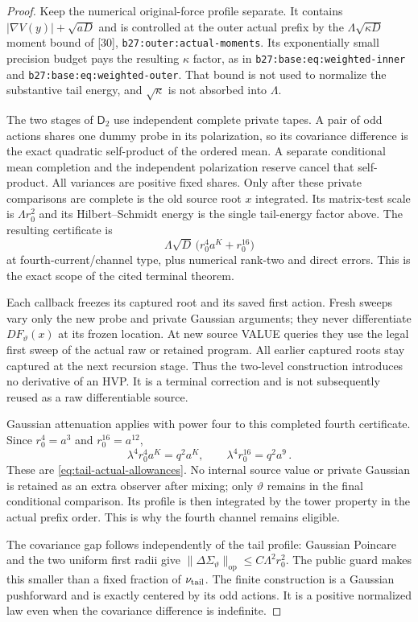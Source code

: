 \documentclass[11pt]{article}
\numberwithin{equation}{section}
\theoremstyle{remark}\newtheorem{remark}[theorem]{Remark}
\newcommand{\op}{\mathrm{op}}\newcommand{\LL}{\Lambda}
\newcommand{\norm}[1]{\lVert#1\rVert}
\newcommand{\src}[1]{\texttt{\nolinkurl{#1}}}
\begin{document}
\begin{proof}
Keep the numerical original-force profile separate. It contains
$|\nabla V(y)|+\sqrt{aD}$ and is controlled at the outer actual
prefix by the $\LL\sqrt{\kappa D}$ moment bound of [30],
\src{b27:outer:actual-moments}. Its exponentially small precision
budget pays the resulting $\kappa$ factor, as in
\src{b27:base:eq:weighted-inner} and
\src{b27:base:eq:weighted-outer}. That bound is not used to
normalize the substantive tail energy, and $\sqrt\kappa$ is
not absorbed into $\LL$.

The two stages of $\mathsf D_2$ use independent complete private
tapes. A pair of odd actions shares one dummy probe in its
polarization, so its covariance difference is the exact quadratic
self-product of the ordered mean. A separate conditional mean
completion and the independent polarization reserve cancel that
self-product. All variances are positive fixed shares. Only after
these private comparisons are complete is the old source root $x$
integrated. Its matrix-test scale is $\LL r_0^2$ and its
Hilbert--Schmidt energy is the single tail-energy factor above.
The resulting certificate is
\[
 \LL\sqrt D\,\bigl(r_0^4a^K+r_0^{16}\bigr)
\]
at fourth-current/channel type, plus numerical rank-two and direct
errors. This is the exact scope of the cited terminal theorem.

Each callback freezes its captured root and its saved first action.
Fresh sweeps vary only the new probe and private Gaussian arguments;
they never differentiate $DF_\vartheta(x)$ at its frozen location.
At new source VALUE queries they use the legal first sweep of the
actual raw or retained program. All earlier captured roots stay
captured at the next recursion stage. Thus the two-level construction
introduces no derivative of an HVP. It is a terminal correction and
is not subsequently reused as a raw differentiable source.

Gaussian attenuation applies with power four to this completed
fourth certificate. Since $r_0^4=a^3$ and $r_0^{16}=a^{12}$,
\[
 \lambda^4r_0^4a^K=q^2a^K,\qquad
 \lambda^4r_0^{16}=q^2a^9\,.
\]
These are \eqref{eq:tail-actual-allowances}. No internal source
value or private Gaussian is retained as an extra observer after
mixing; only $\vartheta$ remains in the final conditional comparison.
Its profile is then integrated by the tower property in the actual
prefix order. This is why the fourth channel remains eligible.

The covariance gap follows independently of the tail profile:
Gaussian Poincare and the two uniform first radii give
$\norm{\Delta\Sigma_\vartheta}_{\op}\le C\LL^2r_0^2$.
The public guard makes this smaller than a fixed fraction of
$\nu_{\rm tail}$. The finite construction is a Gaussian pushforward
and is exactly centered by its odd actions. It is a positive
normalized law even when the covariance difference is indefinite.


\end{proof}
\end{document}
